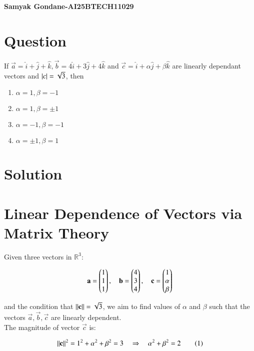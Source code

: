 \documentclass{article}
\begin{document}
\begin{center}
\large
    \textbf{Samyak Gondane-AI25BTECH11029}
\end{center}
\date{}

\section*{Question}
If $\vec{a} = \hat{i} + \hat{j} + \hat{k}, \vec{b} = 4\hat{i} + 3\hat{j} + 4\hat{k}$ and $\vec{c} = \hat{i} + \alpha\hat{j} + \beta\hat{k}$ are linearly dependant vectors and $\left\vert c\right\vert = \sqrt{3}$, then
\begin{multicols}{2}
\begin{enumerate}
    \item $\alpha = 1, \beta = -1$
    \item $\alpha = 1, \beta = \pm1$
    \item $\alpha = -1, \beta = -1$
    \item $\alpha = \pm1, \beta = 1$
\end{enumerate}
\end{multicols}

\section*{Solution}
\section*{Linear Dependence of Vectors via Matrix Theory}

Given three vectors in $\mathbb{R}^3$:


\begin{align}
\mathbf{a} = \begin{pmatrix}1 \\ 1 \\ 1\end{pmatrix}, \quad
\mathbf{b} = \begin{pmatrix}4 \\ 3 \\ 4\end{pmatrix}, \quad
\mathbf{c} = \begin{pmatrix}1 \\ \alpha \\ \beta\end{pmatrix}
\end{align}


and the condition that $\left\lVert\mathbf{c}\right\rVert = \sqrt{3}$, we aim to find values of $\alpha$ and $\beta$ such that the vectors $\vec{a}, \vec{b}, \vec{c}$ are linearly dependent.\\

The magnitude of vector $\vec{c}$ is:


\begin{align}
\left\lVert\mathbf{c}\right\rVert^2 = 1^2 + \alpha^2 + \beta^2 = 3 \quad \Rightarrow \quad \alpha^2 + \beta^2 = 2 \tag{1}
\end{align}
\end{document}

